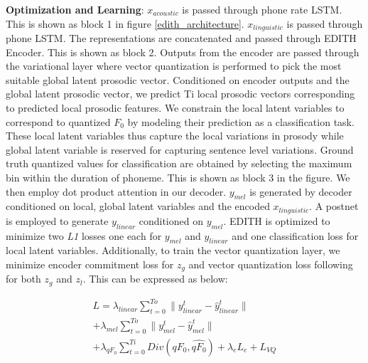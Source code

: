 \textbf{Optimization and Learning}: $x_{acoustic}$ is passed through phone rate LSTM. This is shown as block 1 in figure \ref{edith_architecture}. $x_{linguistic}$ is passed through phone LSTM. The representations are concatenated and passed through EDITH Encoder. This is shown as block 2. Outputs from the encoder are passed through the variational layer where vector quantization is performed to pick the most suitable global latent prosodic vector. Conditioned on encoder outputs and the global latent prosodic vector, we predict Ti local prosodic vectors corresponding to predicted local prosodic features. 
We constrain the local latent variables to correspond to quantized $F_0$ by modeling their prediction as a classification task. These local latent variables thus capture the local variations in prosody while global latent variable is reserved for capturing sentence level variations. Ground truth quantized values for classification are obtained by selecting the maximum bin within the duration of phoneme. This is shown as block 3 in the figure. We then employ dot product attention in our decoder. \textbf{$y_{mel}$} is generated by decoder conditioned on local, global latent variables and the encoded $x_{linguistic}$. A postnet is employed to generate \textbf{$y_{linear}$} conditioned on \textbf{$y_{mel}$}. EDITH is optimized to minimize two \textit{L1} losses one each for \textbf{$y_{mel}$} and \textbf{$y_{linear}$} and one classification loss for local latent variables. Additionally, to train the vector quantization layer, we minimize encoder commitment loss for $z_g$ and vector quantization loss following \cite{vqvae} for both $z_g$ and $z_l$. This can be expressed as below:

\begin{equation} \label{eq1}
\begin{split}
\textit{L} = \lambda_{linear} \sum_{t=0}^{To} \| y_{linear}^t - \hat{y}_{linear}^t \|  \\
+ \lambda_{mel} \sum_{t=0}^{To} \| y_{mel}^t - \hat{y}_{mel}^t \| \\
+ \lambda_{qF_0} \sum_{t=0}^{Ti} Div(qF_0, \hat{qF_0}) + \lambda_{e} L_{e} + L_{VQ}\\
\end{split}
\end{equation}




